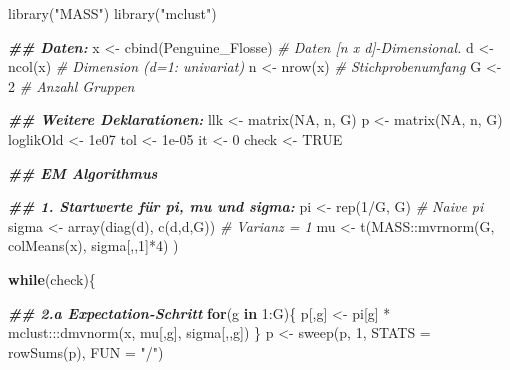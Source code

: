 \documentclass[
  ngerman,
]{book}
\newenvironment{Shaded}{\begin{snugshade}}{\end{snugshade}}
\newcommand{\AttributeTok}[1]{\textcolor[rgb]{0.77,0.63,0.00}{#1}}
\newcommand{\CommentTok}[1]{\textcolor[rgb]{0.56,0.35,0.01}{\textit{#1}}}
\newcommand{\ConstantTok}[1]{\textcolor[rgb]{0.00,0.00,0.00}{#1}}
\newcommand{\ControlFlowTok}[1]{\textcolor[rgb]{0.13,0.29,0.53}{\textbf{#1}}}
\newcommand{\DecValTok}[1]{\textcolor[rgb]{0.00,0.00,0.81}{#1}}
\newcommand{\DocumentationTok}[1]{\textcolor[rgb]{0.56,0.35,0.01}{\textbf{\textit{#1}}}}
\newcommand{\FloatTok}[1]{\textcolor[rgb]{0.00,0.00,0.81}{#1}}
\newcommand{\FunctionTok}[1]{\textcolor[rgb]{0.00,0.00,0.00}{#1}}
\newcommand{\NormalTok}[1]{#1}
\newcommand{\OtherTok}[1]{\textcolor[rgb]{0.56,0.35,0.01}{#1}}
\newcommand{\SpecialCharTok}[1]{\textcolor[rgb]{0.00,0.00,0.00}{#1}}
\newcommand{\StringTok}[1]{\textcolor[rgb]{0.31,0.60,0.02}{#1}}
\begin{document}
\begin{Shaded}
\begin{Highlighting}[]
\FunctionTok{library}\NormalTok{(}\StringTok{"MASS"}\NormalTok{)}
\FunctionTok{library}\NormalTok{(}\StringTok{"mclust"}\NormalTok{)}

\DocumentationTok{\#\# Daten:}
\NormalTok{x }\OtherTok{\textless{}{-}} \FunctionTok{cbind}\NormalTok{(Penguine\_Flosse) }\CommentTok{\# Daten [n x d]{-}Dimensional. }
\NormalTok{d }\OtherTok{\textless{}{-}} \FunctionTok{ncol}\NormalTok{(x)                }\CommentTok{\# Dimension (d=1: univariat)}
\NormalTok{n }\OtherTok{\textless{}{-}} \FunctionTok{nrow}\NormalTok{(x)                }\CommentTok{\# Stichprobenumfang}
\NormalTok{G }\OtherTok{\textless{}{-}} \DecValTok{2}                      \CommentTok{\# Anzahl Gruppen}

\DocumentationTok{\#\# Weitere Deklarationen:}
\NormalTok{llk       }\OtherTok{\textless{}{-}} \FunctionTok{matrix}\NormalTok{(}\ConstantTok{NA}\NormalTok{, n, G)}
\NormalTok{p         }\OtherTok{\textless{}{-}} \FunctionTok{matrix}\NormalTok{(}\ConstantTok{NA}\NormalTok{, n, G)  }
\NormalTok{loglikOld }\OtherTok{\textless{}{-}} \FloatTok{1e07}
\NormalTok{tol       }\OtherTok{\textless{}{-}} \FloatTok{1e{-}05}
\NormalTok{it        }\OtherTok{\textless{}{-}} \DecValTok{0}
\NormalTok{check     }\OtherTok{\textless{}{-}} \ConstantTok{TRUE} 


\DocumentationTok{\#\# EM Algorithmus}

\DocumentationTok{\#\# 1. Startwerte für pi, mu und sigma:}
\NormalTok{pi    }\OtherTok{\textless{}{-}} \FunctionTok{rep}\NormalTok{(}\DecValTok{1}\SpecialCharTok{/}\NormalTok{G, G)              }\CommentTok{\# Naive pi}
\NormalTok{sigma }\OtherTok{\textless{}{-}} \FunctionTok{array}\NormalTok{(}\FunctionTok{diag}\NormalTok{(d), }\FunctionTok{c}\NormalTok{(d,d,G)) }\CommentTok{\# Varianz = 1}
\NormalTok{mu    }\OtherTok{\textless{}{-}} \FunctionTok{t}\NormalTok{(MASS}\SpecialCharTok{::}\FunctionTok{mvrnorm}\NormalTok{(G, }\FunctionTok{colMeans}\NormalTok{(x), sigma[,,}\DecValTok{1}\NormalTok{]}\SpecialCharTok{*}\DecValTok{4}\NormalTok{) )}

\ControlFlowTok{while}\NormalTok{(check)\{}
  
  \DocumentationTok{\#\# 2.a Expectation{-}Schritt }
  \ControlFlowTok{for}\NormalTok{(g }\ControlFlowTok{in} \DecValTok{1}\SpecialCharTok{:}\NormalTok{G)\{}
\NormalTok{    p[,g] }\OtherTok{\textless{}{-}}\NormalTok{ pi[g] }\SpecialCharTok{*}\NormalTok{ mclust}\SpecialCharTok{:::}\FunctionTok{dmvnorm}\NormalTok{(x, mu[,g], sigma[,,g])}
\NormalTok{  \}}
\NormalTok{  p }\OtherTok{\textless{}{-}} \FunctionTok{sweep}\NormalTok{(p, }\DecValTok{1}\NormalTok{, }\AttributeTok{STATS =} \FunctionTok{rowSums}\NormalTok{(p), }\AttributeTok{FUN =} \StringTok{"/"}\NormalTok{)}
  

\end{Highlighting}
\end{Shaded}
\end{document}
